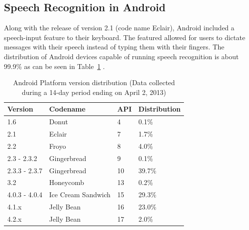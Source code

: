 \subsection{Speech Recognition in Android}
Along with the release of version 2.1 (code name Eclair), Android included a speech-input feature to their keyboard. The featured allowed for users to dictate messages with their speech instead of typing them with their fingers. The distribution of Android devices capable of running speech recognition is about 99.9\% as can be seen in Table~\ref{tab:anddist} \citep{andspeechrec}. 
\begin{table}[h]
\centering
\caption{Android Platform version distribution (Data collected during a 14-day period ending on April 2, 2013)\citep{andDist}}
    \begin{tabular}{ l  l  l  l }
        \hline
        Version & Codename & API & Distribution \\
        \hline 
        1.6 & Donut & 4 & 0.1\% \\ 
        2.1 & Eclair & 7 & 1.7\% \\
        2.2	& Froyo & 8 & 4.0\% \\
        2.3 - 2.3.2 & Gingerbread & 9 & 0.1\% \\ 
        2.3.3 - 2.3.7 &	Gingerbread & 10 & 39.7\% \\ 
        3.2 & Honeycomb & 13 & 0.2\% \\
        4.0.3 - 4.0.4 &	Ice Cream Sandwich & 15 & 29.3\% \\ 
        4.1.x &	Jelly Bean & 16 & 23.0\% \\
        4.2.x & Jelly Bean & 17 & 2.0\% \\ 
        \end{tabular}     
\label{tab:anddist}
\end{table}























